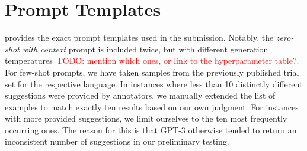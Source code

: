\documentclass[11pt]{article}
\newcommand{\todo}[1]{\textcolor{red}{TODO: #1}}
\begin{document}



\appendix

\section{Prompt Templates}
\label{sec:prompts}

 provides the exact prompt templates used in the submission. Notably, the \emph{zero-shot with context} prompt is included twice, but with different generation temperatures~\todo{mention which ones, or link to the hyperparameter table?}.
For few-shot prompts, we have taken samples from the previously published trial set for the respective language. In instances where less than 10 distinctly different suggestions were provided by annotators, we manually extended the list of examples to match exactly ten results based on our own judgment. For instances with more provided suggestions, we limit ourselves to the ten most frequently occurring ones. The reason for this is that GPT-3 otherwise tended to return an inconsistent number of suggestions in our preliminary testing.
\end{document}
